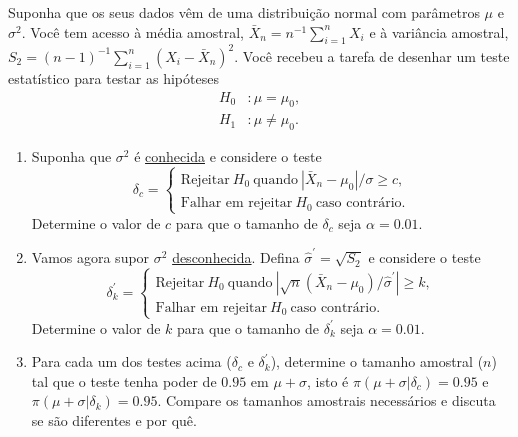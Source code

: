 \documentclass[a4paper,10pt, notitlepage]{report}
\begin{document}
Suponha que os seus dados vêm de uma distribuição normal com parâmetros $\mu$ e $\sigma^2$.
Você tem acesso à média amostral, $\bar{X}_n = n^{-1} \sum_{i=1}^n X_i$ e à variância amostral, $S_2 = (n-1)^{-1} \sum_{i=1}^n (X_i - \bar{X}_n)^2$.
Você recebeu a tarefa de desenhar um teste estatístico para testar as hipóteses
\begin{align*}
    H_0 &:  \mu = \mu_0,\\
    H_1 &: \mu \neq \mu_0.
\end{align*}
\begin{enumerate}
    \item Suponha que $\sigma^2$ é \underline{conhecida} e considere o teste
    \begin{equation*}
        \delta_c = \begin{cases}
            \textrm{Rejeitar} \: H_0 \: \textrm{quando} \: |\bar{X}_n - \mu_0|/\sigma \geq c,\\
            \textrm{Falhar em rejeitar} \: H_0 \: \textrm{caso contrário}.
        \end{cases}
    \end{equation*}
    Determine o valor de $c$ para que o tamanho de $\delta_c$ seja $\alpha = 0.01$.
    \item Vamos agora supor $\sigma^2$ \underline{desconhecida}.
    Defina $\hat{\sigma}^\prime = \sqrt{S_2}$ e considere o teste     \begin{equation*}
        \delta_k^\prime = \begin{cases}
            \textrm{Rejeitar} \: H_0 \: \textrm{quando} \: |\sqrt{n}(\bar{X}_n - \mu_0)/\hat{\sigma}^\prime|  \geq k,\\
            \textrm{Falhar em rejeitar} \: H_0 \: \textrm{caso contrário}.
        \end{cases}
       \end{equation*}
         Determine o valor de $k$ para que o tamanho de $\delta_k^\prime$ seja $\alpha = 0.01$.
    \item Para cada um dos testes acima ($\delta_c$ e $\delta^\prime_k$), determine o tamanho amostral ($n$) tal que o teste tenha poder de $0.95$ em $\mu + \sigma$, isto é $\pi(\mu + \sigma | \delta_c) = 0.95$ e $\pi(\mu + \sigma | \delta_k) = 0.95$.
    Compare os tamanhos amostrais necessários e discuta se são diferentes e por quê.
\end{enumerate}

% 
% 
\end{document}
